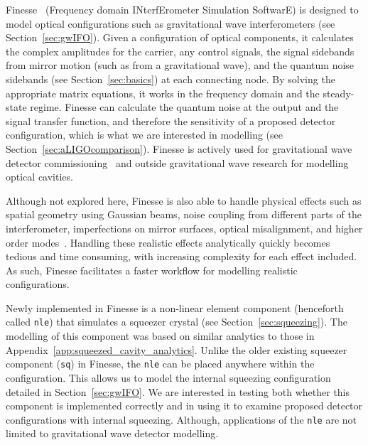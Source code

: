 \documentclass[aps,pra,superscriptaddress,reprint,nofootinbib]{revtex4-1}
\newcommand{\code}[1]{\texttt{#1}}
\begin{document}
Finesse~\cite{finesse} (Frequency domain INterfErometer Simulation SoftwarE) is designed to model optical configurations such as gravitational wave interferometers (see Section~\ref{sec:gwIFO}). Given a configuration of optical components, it calculates the complex amplitudes for the carrier, any control signals, the signal sidebands from mirror motion (such as from a gravitational wave), and the quantum noise sidebands (see Section~\ref{sec:basics}) at each connecting node. By solving the appropriate matrix equations, it works in the frequency domain and the steady-state regime.
Finesse can calculate the quantum noise at the output and the signal transfer function, and therefore the sensitivity of a proposed detector configuration, which is what we are interested in modelling (see Section~\ref{sec:aLIGOcomparison}). Finesse is actively used for gravitational wave detector commissioning~\cite{brown2020pykat} and outside gravitational wave research for modelling optical cavities.


Although not explored here, Finesse is also able to handle physical effects such as spatial geometry using Gaussian beams, noise coupling from different parts of the interferometer, imperfections on mirror surfaces, optical misalignment, and higher order modes~\cite{Bond_et_al_2016}.
Handling these realistic effects analytically quickly becomes tedious and time consuming, with increasing complexity for each effect included. As such, Finesse facilitates a faster workflow for modelling realistic configurations.


Newly implemented in Finesse is a non-linear element component (henceforth called \code{nle}) that simulates a squeezer crystal (see Section~\ref{sec:squeezing}). The modelling of this component was based on similar analytics to those in Appendix~\ref{app:squeezed_cavity_analytics}. Unlike the older existing squeezer component (\code{sq}) in Finesse, the \code{nle} can be placed anywhere within the configuration. This allows us to model the internal squeezing configuration detailed in Section~\ref{sec:gwIFO}. We are interested in testing both whether this component is implemented correctly and in using it to examine proposed detector configurations with internal squeezing. Although, applications of the \code{nle} are not limited to gravitational wave detector modelling.
\end{document}

